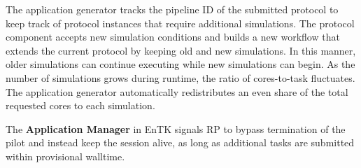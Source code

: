 

The application generator tracks the pipeline ID of the submitted protocol to 
keep track of protocol instances that require additional simulations. The 
protocol component accepts new simulation conditions and builds a new workflow 
that extends the current protocol by keeping old and new simulations. In this 
manner, older simulations can continue executing while new simulations can 
begin. As the number of simulations grows during runtime, the ratio of 
cores-to-task fluctuates. The application generator automatically redistributes 
an even share of the total requested cores to each simulation. 

The \textbf{Application Manager} in EnTK signals RP to 
bypass termination of the pilot and instead keep the session alive, as long as 
additional tasks are submitted within provisional walltime. 












